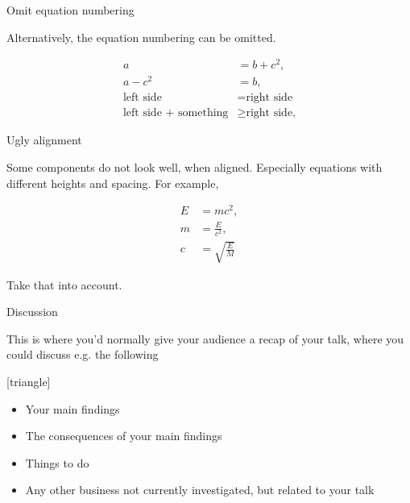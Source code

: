 \documentclass[8pt]{beamer}
\begin{document}
\begin{frame}[label = oen]{Omit equation numbering}

Alternatively, the equation numbering can be omitted.

\begin{align*} 
a &= b + c^2, \\ 
a - c^2 &= b, \\
\text{left side} &= \text{right side} \\ 
\text{left side + something} &\geq \text{right side,}
\end{align*}

\end{frame}

\begin{frame}[label = ua]{Ugly alignment}

Some components do not look well, when aligned. Especially equations with different heights and spacing. For example,

\begin{align} 
E &= mc^2, \\ 
m &= \frac{E}{c^2}, \\
c &= \sqrt{\frac{E}{M}}
\end{align}

Take that into account.

\end{frame}

\begin{frame}[label = disc]{Discussion}

This is where you’d normally give your audience a recap of your talk, where you could discuss e.g. the following

[triangle]
\begin{itemize}
 \item Your main findings
 \item The consequences of your main findings
 \item Things to do
 \item Any other business not currently investigated, but related to your talk
\end{itemize}

\end{frame}
\end{document}
